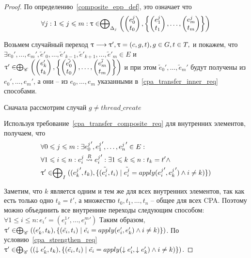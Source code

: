 \begin{itemize}
\begin{proof}
По определению~\ref{composite_epp_def}, это означает что
$$\forall j: 1\leqslant j \leqslant m: \uptau \in  \mathrel{\bigoplus}_{\Delta_j}
\left(
\begin{pmatrix}
e^j_0 \\
t_0 
\end{pmatrix},
\left\{
\begin{pmatrix}
e^j_1 \\
t_1 
\end{pmatrix},
\dots ,
\begin{pmatrix}
e^j_m \\
t_m 
\end{pmatrix}
\right\}
\right)$$

Возьмем случайный переход
$ \uptau \longrightarrow \uptau', \uptau=(c,g,t), g \in G, t \in T, $ и покажем, что 
$\exists e_0', \dots, e_m', \tilde{e}'_0, \dots, \tilde{e}'_{k-1}, \tilde{e}'_{k+1}, \dots, \tilde{e}'_m \in E$ и
$\uptau' \in  \mathrel{\bigoplus}_{\mathscr{C}}
\left(
\begin{pmatrix}
e'_k \\
t_k 
\end{pmatrix},
\left\{
\begin{pmatrix}
\tilde{e'_0} \\
t_0 
\end{pmatrix},
\dots ,
\begin{pmatrix}
\tilde{e'_m} \\
t_m 
\end{pmatrix}
\right\}
\right)$ 
и при этом $\tilde{e}_0', \dots, \tilde{e}_m'$ будут получены из $e_0', \dots, e_m'$, а они -- из $e_0, \dots, e_m$ указанными в~\ref{cpa_transfer_inner_req} способами.

Сначала рассмотрим случай $g \neq thread\_create$

Используя требование~\ref{cpa_transfer_composite_req} для внутренних элементов, получаем, что 
\begin{align*}
& \forall 0 \leqslant j \leqslant m: \exists {e^j_0}', {e^j_1}', \dots, {e^j_n}' \in E: \\
& \forall 1 \leqslant i \leqslant n: e^j_i \stackrel{R}{\leadsto} {e^j_i}': \exists 1 \leqslant k \leqslant n: t_k = t' \land \\
& \uptau' \in \mathrel{\bigoplus}_I(({e^j_k}', t_k), \{(\tilde{e^j_i}, t_i) \mid \tilde{e^j_i} = apply({e^j_i}', {e^j_k}') \land i \neq k)\})
\end{align*}

Заметим, что $k$ является одним и тем же для всех внутренних элементов, так как есть только одно $t_k = t'$, а множество $t_0, t_1, \dots, t_n$ -- общее для всех CPA.
Поэтому можно объединить все внутренние переходы следующим способом:
$ \forall 1 \le i \le n: e_i' = ({e^1_i}', \dots, {e^m_i}')$
Таким образом, $\uptau' \in \mathrel{\bigoplus}_{\mathscr{C}}((e_k', t_k), \{(\tilde{e_i}, t_i) \mid \tilde{e_i} = apply(e'_i, e'_k) \land i \neq k)\})$.
По условию~\ref{cpa_strengthen_req} $\uptau' \in \mathrel{\bigoplus}_{\mathscr{C}}((\downarrow e_k', t_k), \{(\tilde{e_i}, t_i) \mid \tilde{e_i} = apply(\downarrow  e'_i, \downarrow  e'_k) \land i \neq k)\})$.


\end{proof}
\end{itemize}
